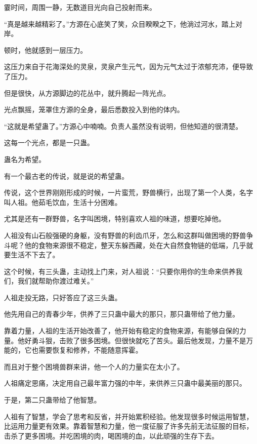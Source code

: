 
\begin{this_body}

霎时间，周围一静，无数道目光向自己投射而来。

“真是越来越精彩了。”方源在心底笑了笑，众目睽睽之下，他淌过河水，踏上对岸。

顿时，他就感到一层压力。

这压力来自于花海深处的灵泉，灵泉产生元气，因为元气太过于浓郁充沛，便导致了压力。

但是很快，从方源脚边的花丛中，就升腾起一阵光点。

光点飘摇，笼罩住方源的全身，最后悉数投入到他的体内。

“这就是希望蛊了。”方源心中喃喃。负责人虽然没有说明，但他知道的很清楚。

这每一个光点，都是一只蛊。

蛊名为希望。

有一个最古老的传说，就是说的希望蛊。

传说，这个世界刚刚形成的时候，一片蛮荒，野兽横行，出现了第一个人类，名字叫人祖。他茹毛饮血，生活十分困难。

尤其是还有一群野兽，名字叫困境，特别喜欢人祖的味道，想要吃掉他。

人祖没有山石般强硬的身躯，没有野兽的利齿爪牙，怎么和这群叫做困境的野兽争斗呢？他的食物来源很不稳定，整天东躲西藏，处在大自然食物链的低端，几乎就要生活不下去了。

这个时候，有三头蛊，主动找上门来，对人祖说：“只要你用你的生命来供养我们，我们就帮助你渡过难关。”

人祖走投无路，只好答应了这三头蛊。

他先用自己的青春少年，供养了三只蛊中最大的那只，那只蛊带给了他力量。

靠着力量，人祖的生活开始改善了，他开始有稳定的食物来源，有能够自保的力量。他好勇斗狠，击败了很多困境。但很快就吃了苦头。最后他发现，力量不是万能的，它也需要恢复和修养，不能随意挥霍。

而且对于整个困境兽群来讲，他一个人的力量实在太小了。

人祖痛定思痛，决定用自己最年富力强的中年，来供养三只蛊中最美丽的那只。

于是，第二只蛊带给了他智慧。

人祖有了智慧，学会了思考和反省，并开始累积经验。他发现很多时候运用智慧，比运用力量更有效果。靠着智慧和力量，他一度征服了许多先前无法征服的目标，击杀了更多困境。并吃困境的肉，喝困境的血，以此顽强的生存下去。


\end{this_body}
